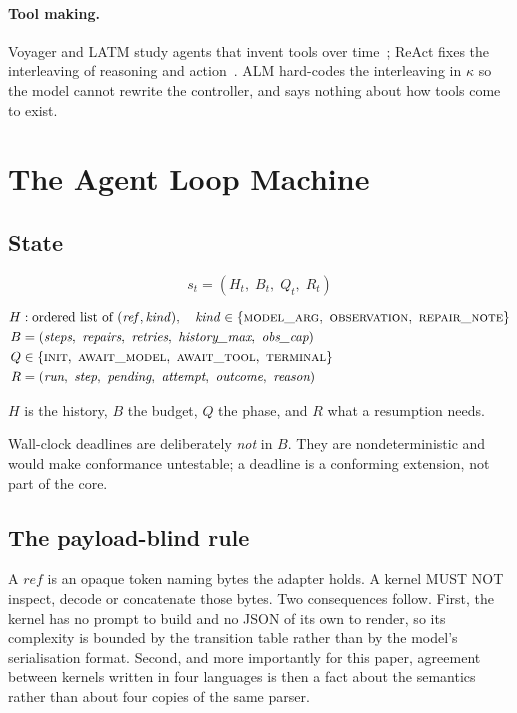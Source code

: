 \documentclass[11pt,a4paper]{article}
\begin{document}
\paragraph{Tool making.}
Voyager and LATM study agents that invent tools over
time~\cite{wang2023voyager,cai2024latm}; ReAct fixes the interleaving of
reasoning and action~\cite{yao2023react}. ALM hard-codes the interleaving in
$\kappa$ so the model cannot rewrite the controller, and says nothing about how
tools come to exist.

\section{The Agent Loop Machine}
\label{sec:alm}

\subsection{State}

\begin{equation}
s_t = (H_t,\; B_t,\; Q_t,\; R_t)
\end{equation}

\begin{align*}
H &: \text{ordered list of } (\mathit{ref}, \mathit{kind}), \quad
     \mathit{kind} \in \{\textsc{model\_arg},\ \textsc{observation},\
     \textsc{repair\_note}\}\\
B &= (\textit{steps},\ \textit{repairs},\ \textit{retries},\
     \textit{history\_max},\ \textit{obs\_cap})\\
Q &\in \{\textsc{init},\ \textsc{await\_model},\ \textsc{await\_tool},\
     \textsc{terminal}\}\\
R &= (\textit{run},\ \textit{step},\ \textit{pending},\ \textit{attempt},\
     \textit{outcome},\ \textit{reason})
\end{align*}

\noindent $H$ is the history, $B$ the budget, $Q$ the phase, and $R$ what a
resumption needs.

Wall-clock deadlines are deliberately \emph{not} in $B$. They are
nondeterministic and would make conformance untestable; a deadline is a
conforming extension, not part of the core.

\subsection{The payload-blind rule}

A $\mathit{ref}$ is an opaque token naming bytes the adapter holds. A kernel
MUST NOT inspect, decode or concatenate those bytes. Two consequences follow.
First, the kernel has no prompt to build and no JSON of its own to render, so
its complexity is bounded by the transition table rather than by the model's
serialisation format. Second, and more importantly for this paper, agreement
between kernels written in four languages is then a fact about the semantics
rather than about four copies of the same parser.
\end{document}
